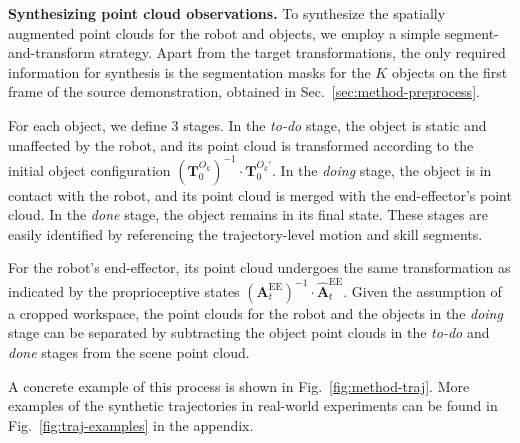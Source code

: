 \vspace{0.2cm} \noindent\textbf{Synthesizing point cloud observations.}
To synthesize the spatially augmented point clouds for the robot and objects, we employ a simple segment-and-transform strategy.
Apart from the target transformations, the only required information for synthesis is the segmentation masks for the $K$ objects on the first frame of the source demonstration, obtained in Sec.~\ref{sec:method-preprocess}.



For each object, we define $3$ stages. In the \textit{to-do} stage, the object is static and unaffected by the robot, and its point cloud is transformed according to the initial object configuration $(\mathbf{T}_0^{{O_k}})^{-1} \cdot \mathbf{T}_0^{{O_k}'}$. In the \textit{doing} stage, the object is in contact with the robot, and its point cloud is merged with the end-effector’s point cloud. In the \textit{done} stage, the object remains in its final state. These stages are easily identified by referencing the trajectory-level motion and skill segments.

For the robot’s end-effector, its point cloud undergoes the same transformation as indicated by the proprioceptive states
$({\mathbf{A}}^\mathrm{EE}_t)^{-1} \cdot \hat{{\mathbf{A}}}^\mathrm{EE}_t$. 
Given the assumption of a cropped workspace, the point clouds for the robot and the objects in the \textit{doing} stage can be separated by subtracting the object point clouds in the \textit{to-do} and \textit{done} stages from the scene point cloud.

A concrete example of this process is shown in Fig.~\ref{fig:method-traj}. More examples of the synthetic trajectories in real-world experiments can be found in Fig.~\ref{fig:traj-examples} in the appendix.